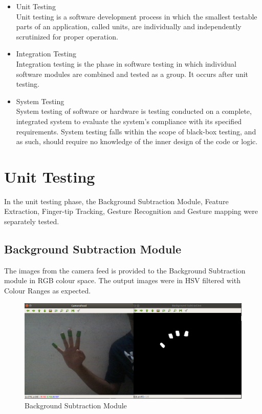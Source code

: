 \documentclass[11pt]{report}
\begin{document}
\begin{itemize}
    \item Unit Testing \\
Unit testing is a software development process in which the smallest testable parts of an
application, called units, are individually and independently scrutinized for proper operation.
    \item Integration Testing \\
    Integration testing is the phase in software testing in which individual software modules are
    combined and tested as a group. It occurs after unit testing.
    \item System Testing \\
    System testing of software or hardware is testing conducted on a complete, integrated system
    to evaluate the system’s compliance with its specified requirements. System testing falls
    within the scope of black-box testing, and as such, should require no knowledge of the inner
    design of the code or logic.
\end{itemize}
\section{Unit Testing}
In the unit testing phase, the Background Subtraction Module, Feature Extraction, Finger-tip Tracking, Gesture Recognition
and Gesture mapping were separately tested.

\subsection{Background Subtraction Module}

The images from the camera feed is provided to the Background Subtraction
module in RGB colour space. The output images were in HSV filtered with Colour Ranges as expected.

\begin{figure}[h]
    \includegraphics[width=15cm]{backgroundtesting.png}
    \caption{Background Subtraction Module}
\end{figure}
\end{document}
